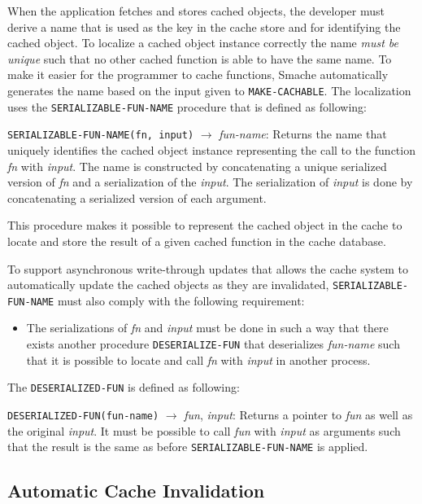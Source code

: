 When the application fetches and stores cached objects, the developer must derive a name that is used as the key in the cache store and for identifying the cached object. To localize a cached object instance correctly the name \emph{must be unique} such that no other cached function is able to have the same name. To make it easier for the programmer to cache functions, Smache automatically generates the name based on the input given to \verb$MAKE-CACHABLE$. The localization uses the \verb$SERIALIZABLE-FUN-NAME$ procedure that is defined as following:

\verb$SERIALIZABLE-FUN-NAME(fn, input)$ $\rightarrow$ \emph{fun-name}: Returns the name that uniquely identifies the cached object instance representing the call to the function \emph{fn} with \emph{input}. The name is constructed by concatenating a unique serialized version of \emph{fn} and a serialization of the \emph{input}. The serialization of \emph{input} is done by concatenating a serialized version of each argument.

This procedure makes it possible to represent the cached object in the cache to locate and store the result of a given cached function in the cache database.

To support asynchronous write-through updates that allows the cache system to automatically update the cached objects as they are invalidated, \verb$SERIALIZABLE-FUN-NAME$ must also comply with the following requirement:

\begin{itemize}
  \item The serializations of \emph{fn} and \emph{input} must be done in such a way that there exists another procedure \verb$DESERIALIZE-FUN$ that deserializes \emph{fun-name} such that it is possible to locate and call \emph{fn} with \emph{input} in another process.
\end{itemize}

The \verb$DESERIALIZED-FUN$ is defined as following:

\verb$DESERIALIZED-FUN(fun-name)$ $\rightarrow$ \emph{fun}, \emph{input}: Returns a pointer to \emph{fun} as well as the original \emph{input}. It must be possible to call \emph{fun} with \emph{input} as arguments such that the result is the same as before \verb$SERIALIZABLE-FUN-NAME$ is applied.


\subsection{Automatic Cache Invalidation}
\label{subsec:automatic_cache_invalidation}

